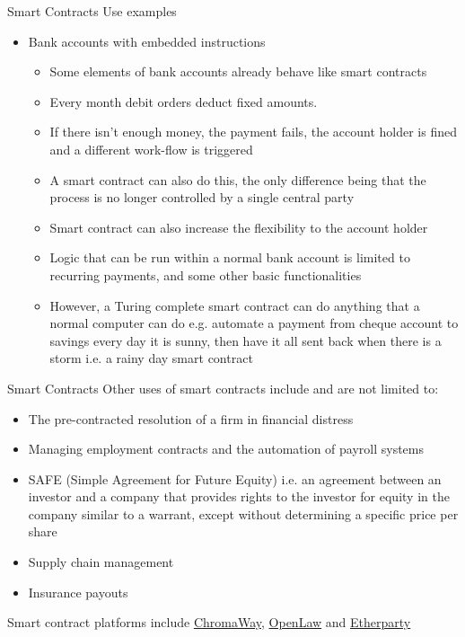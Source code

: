 \documentclass[9pt]{beamer}
\begin{document}
\begin{frame}{Smart Contracts}
	Use examples
	\begin{itemize}
		\item Bank accounts with embedded instructions
		\begin{itemize}
			\item Some elements of bank accounts already behave like smart contracts
			\item Every month debit orders deduct fixed amounts.
			\item If there isn't enough money, the payment fails, the account holder is fined and a different work-flow is triggered
			\item A smart contract can also do this, the only difference being that the process is no longer controlled by a single central party
			\item Smart contract can also increase the flexibility to the account holder
			\item Logic that can be run within a normal bank account is limited to recurring payments, and some other basic functionalities
			\item However, a Turing complete smart contract can do anything that a normal computer can do e.g. automate a payment from cheque account to savings every day it is sunny, then have it all sent back when there is a storm i.e. a rainy day smart contract
		\end{itemize}
	\end{itemize}
\end{frame}


\begin{frame}{Smart Contracts}
	Other uses of smart contracts include and are not limited to:
		\begin{itemize}
			\item The pre-contracted resolution of a firm in financial distress
			\item Managing employment contracts and the automation of payroll systems
			\item SAFE (Simple Agreement for Future Equity) i.e. an agreement between an investor and a company that provides rights to the investor for equity in the company similar to a warrant, except without determining a specific price per share
			\item Supply chain management
			\item Insurance payouts
		\end{itemize}
	Smart contract platforms include \href{https://chromaway.com/}{ChromaWay}, \href{http://openlaw.io/}{OpenLaw} and \href{https://etherparty.io/}{Etherparty}
\end{frame}
\end{document}
